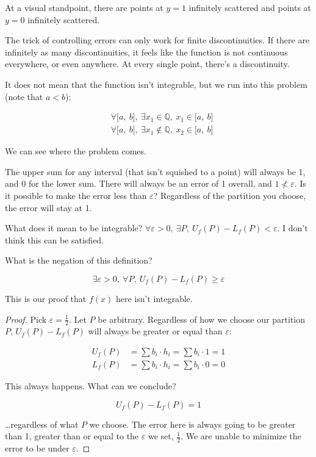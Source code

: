 \documentclass[12pt]{article}
\theoremstyle{plain}
\theoremstyle{remark}
\theoremstyle{definition}
\begin{document}
At a visual standpoint, there are points at \(y = 1\) infinitely
scattered and points at \(y = 0\) infinitely scattered.

The trick of controlling errors can only work for finite
discontinuities. If there are infinitely as many discontinuities, it
feels like the function is not continuous everywhere, or even anywhere.
At every single point, there's a discontinuity.

It does not mean that the function isn't integrable, but we run into
this problem (note that \(a < b\)):

\begin{align*}
&\forall\lbrack a,\ b\rbrack,\ \exists x_{1}\mathbb{\in Q,\ }x_{1} \in \lbrack a,\ b\rbrack \\
&\forall\lbrack a,\ b\rbrack,\ \exists x_{1}\mathbb{\notin Q,\ }x_{2} \in \lbrack a,\ b\rbrack
\end{align*}


We can see where the problem comes.


The upper sum for any interval (that isn't squished to a point) will
always be 1, and 0 for the lower sum. There will always be an error of 1
overall, and \(1 \nless \varepsilon\). Is it possible to make the error
less than \(\varepsilon\)? Regardless of the partition you choose, the
error will stay at 1.

What does it mean to be integrable?
\(\forall\varepsilon > 0,\ \exists P,\ U_{f}(P) - L_{f}(P) < \varepsilon\).
I don't think this can be satisfied.

What is the negation of this definition?

\[\exists\varepsilon > 0,\ \forall P,\ U_{f}(P) - L_{f}(P) \geq \varepsilon\]

This is our proof that \(f(x)\) here isn't integrable.

\begin{proof} Pick \(\varepsilon = \frac{1}{2}\). Let \(P\) be
arbitrary. Regardless of how we choose our partition \(P\),
\(U_{f}(P) - L_{f}(P)\) will always be greater or equal than
\(\varepsilon\):

\begin{align*}
U_{f}(P) &= \sum b_{i} \cdot h_{i} = \sum b_{i} \cdot 1 = 1 \\
L_{f}(P) &= \sum b_{i} \cdot h_{i} = \sum b_{i} \cdot 0 = 0
\end{align*}


This always happens. What can we conclude?

\[U_{f}(P) - L_{f}(P) = 1\]

\ldots regardless of what \(P\) we choose. The error here is always
going to be greater than 1, greater than or equal to the \(\varepsilon\)
we set, \(\frac{1}{2}\). We are unable to minimize the error to be under
\(\varepsilon\). 
\end{proof}
\end{document}
